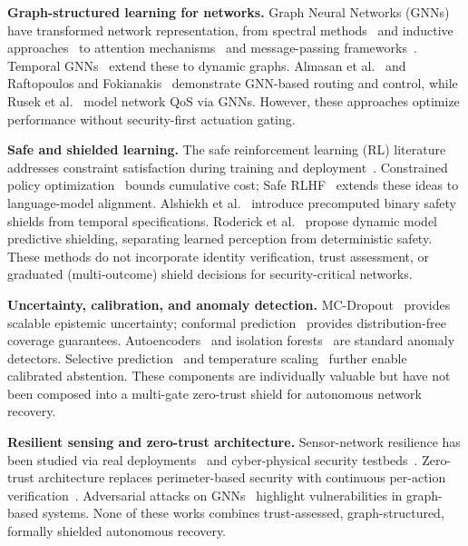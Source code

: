 \noindent\textbf{Graph-structured learning for networks.}
Graph Neural Networks (GNNs) have transformed network representation, from spectral methods~\cite{kipf2017gcn} and inductive approaches~\cite{hamilton2017graphsage} to attention mechanisms~\cite{velickovic2018gat} and message-passing frameworks~\cite{gilmer2017mpnn,xu2019gin}.
Temporal GNNs~\cite{rossi2020tgn,yun2019gtn} extend these to dynamic graphs.
Almasan et al.~\cite{almasan2022deep} and Raftopoulos and Fokianakis~\cite{raftopoulos2024drl} demonstrate GNN-based routing and control, while Rusek et al.~\cite{rusek2020routenet} model network QoS via GNNs.
However, these approaches optimize performance without security-first actuation gating.

\noindent\textbf{Safe and shielded learning.}
The safe reinforcement learning (RL) literature addresses constraint satisfaction during training and deployment~\cite{garcia2015saferl,brunke2022safe}.
Constrained policy optimization~\cite{achiam2017cpo} bounds cumulative cost; Safe RLHF~\cite{dai2024saferlhf} extends these ideas to language-model alignment.
Alshiekh et al.~\cite{alshiekh2018shielding} introduce precomputed binary safety shields from temporal specifications.
Roderick et al.~\cite{roderick2024dmps} propose dynamic model predictive shielding, separating learned perception from deterministic safety.
These methods do not incorporate identity verification, trust assessment, or graduated (multi-outcome) shield decisions for security-critical networks.

\noindent\textbf{Uncertainty, calibration, and anomaly detection.}
MC-Dropout~\cite{gal2016dropout} provides scalable epistemic uncertainty; conformal prediction~\cite{angelopoulos2023conformal} provides distribution-free coverage guarantees.
Autoencoders~\cite{an2015variational,chalapathy2019deep} and isolation forests~\cite{zahoor2025ifocsvm,haque2023dbscanwsn} are standard anomaly detectors.
Selective prediction~\cite{geifman2017selective} and temperature scaling~\cite{guo2017calibration} further enable calibrated abstention.
These components are individually valuable but have not been composed into a multi-gate zero-trust shield for autonomous network recovery.

\noindent\textbf{Resilient sensing and zero-trust architecture.}
Sensor-network resilience has been studied via real deployments~\cite{sensorscope2008,intel_lab_data_2004} and cyber-physical security testbeds~\cite{goh2017swat,wadi2018,cardenas2011attacks}.
Zero-trust architecture replaces perimeter-based security with continuous per-action verification~\cite{rose2020nist,chen2024survey,stafford2020zerotrust}.
Adversarial attacks on GNNs~\cite{zugner2018adversarial,dai2018adversarial} highlight vulnerabilities in graph-based systems.
None of these works combines trust-assessed, graph-structured, formally shielded autonomous recovery.

